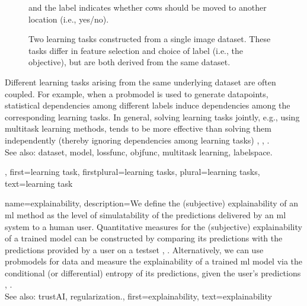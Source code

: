 {{\begin{figure}[H]
\begin{minipage}[t]{0.45\textwidth}
        			and the \gls{label} indicates whether cows should be moved to another location (i.e., yes/no).
			\end{minipage}
			\caption{Two learning tasks constructed from a single image \gls{dataset}. 
			These tasks differ in \gls{feature} selection and choice of \gls{label} (i.e., the objective), 
			but are both derived from the same \gls{dataset}.}
			\label{fig:learning_tasks_cows_dict}
		\end{figure}
		Different learning tasks arising from the same underlying \gls{dataset} are often coupled. 
		For example, when a \gls{probmodel} is used to generate \glspl{datapoint}, statistical 
		dependencies among different \glspl{label} induce dependencies among the corresponding 
		learning tasks. In general, solving learning tasks jointly, e.g., using \gls{multitask learning} 
		methods, tends to be more effective than solving them independently (thereby ignoring 
		dependencies among learning tasks) \cite{Caruana:1997wk}, \cite{JungGaphLassoSPL}, \cite{CSGraphSelJournal}.
	 			\\ 
		See also: \gls{dataset}, \gls{model}, \gls{lossfunc}, \gls{objfunc}, \gls{multitask learning}, \gls{labelspace}.},
	first={learning task},
	firstplural={learning tasks},
	plural={learning tasks}, 
	text={learning task}
}

{name={explainability},
	description={We define the (subjective) explainability of an \gls{ml} method 
		as the level of simulatability \cite{Colin:2022aa} of the \glspl{prediction} 
		delivered by an \gls{ml} system to a human user. Quantitative measures for the 
		(subjective) explainability of a trained \gls{model} can be constructed by 
		comparing its \glspl{prediction} with the \glspl{prediction} provided by a user 
		on a \gls{testset} \cite{Colin:2022aa}, \cite{Zhang:2024aa}. Alternatively, we can use 
		\glspl{probmodel} for \gls{data} and measure the explainability of a trained \gls{ml} 
		\gls{model} via the conditional (or differential) \gls{entropy} of its \glspl{prediction}, given the 
		user's \glspl{prediction} \cite{JunXML2020}, \cite{Chen2018}.
						\\ 
		See also: \gls{trustAI}, \gls{regularization}.},
	first={explainability},
	text={explainability}
}

